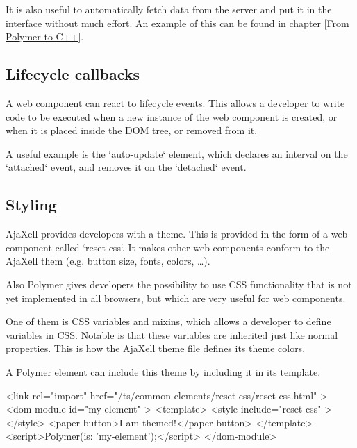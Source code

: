It is also useful to automatically fetch data from the server and put it in the
interface without much effort. An example of this can be found in chapter \ref{From Polymer to C++}.
\subsection{Lifecycle callbacks}
A web component can react to lifecycle events. This allows a developer to write
code to be executed when a new instance of the web component is created, or
when it is placed inside the DOM tree, or removed from it.

A useful example is the `auto-update` element, which declares an interval on the
`attached` event, and removes it on the `detached` event.
\subsection{Styling}
AjaXell provides developers with a theme. This is provided in the form of a
web component called `reset-css`. It makes other web components conform to the
AjaXell them (e.g. button size, fonts, colors, \ldots).

Also Polymer gives developers the possibility to use CSS functionality that is
not yet implemented in all browsers, but which are very useful for web components.

One of them is CSS variables and mixins, which allows a developer to define variables in CSS.
Notable is that these variables are inherited just like normal properties.
This is how the AjaXell theme file defines its theme colors.

A Polymer element can include this theme by including it in its template.
\begin{pyglist}[language=html,numbers=left,numbersep=5pt,fontsize=\small]
<link rel="import" href="/ts/common-elements/reset-css/reset-css.html" >
<dom-module id="my-element" >
  <template>
    <style include="reset-css" ></style>
    <paper-button>I am themed!</paper-button>
  </template>
  <script>Polymer({is: 'my-element'});</script>
</dom-module>
\end{pyglist}

